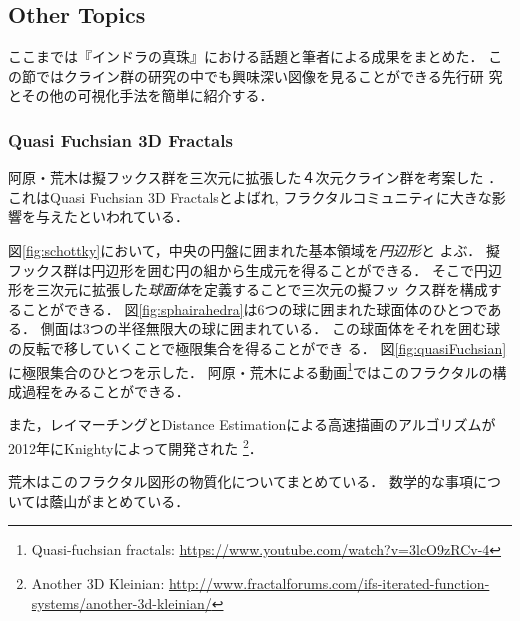 \subsection{Other Topics}

ここまでは『インドラの真珠』における話題と筆者による成果をまとめた．
この節ではクライン群の研究の中でも興味深い図像を見ることができる先行研
究とその他の可視化手法を簡単に紹介する．

\subsubsection{Quasi Fuchsian 3D Fractals}

阿原・荒木は擬フックス群を三次元に拡張した４次元クライン群を考案した
\cite{ahara2003sphairahedral}\cite{ahara2003sphaira}．
これはQuasi Fuchsian 3D Fractalsとよばれ,
フラクタルコミュニティに大きな影響を与えたといわれている．

図\ref{fig:schottky}において，中央の円盤に囲まれた基本領域を\emph{円辺形}と
よぶ．
擬フックス群は円辺形を囲む円の組から生成元を得ることができる．
そこで円辺形を三次元に拡張した\emph{球面体}を定義することで三次元の擬フッ
クス群を構成することができる．
図\ref{fig:sphairahedra}は6つの球に囲まれた球面体のひとつである．
側面は3つの半径無限大の球に囲まれている．
この球面体をそれを囲む球の反転で移していくことで極限集合を得ることができ
る．
図\ref{fig:quasiFuchsian}に極限集合のひとつを示した．
阿原・荒木による動画\footnote{Quasi-fuchsian fractals:
\url{https://www.youtube.com/watch?v=3lcO9zRCv-4}}ではこのフラクタルの構
成過程をみることができる．

また，レイマーチングとDistance Estimationによる高速描画のアルゴリズムが
2012年にKnightyによって開発された
\footnote{Another 3D Kleinian:
 \url{http://www.fractalforums.com/ifs-iterated-function-systems/another-3d-kleinian/}}．

荒木はこのフラクタル図形の物質化についてまとめている\cite{araki2006materializing}．
数学的な事項については蔭山\cite{kageyama2016masterSphaira}がまとめている．

